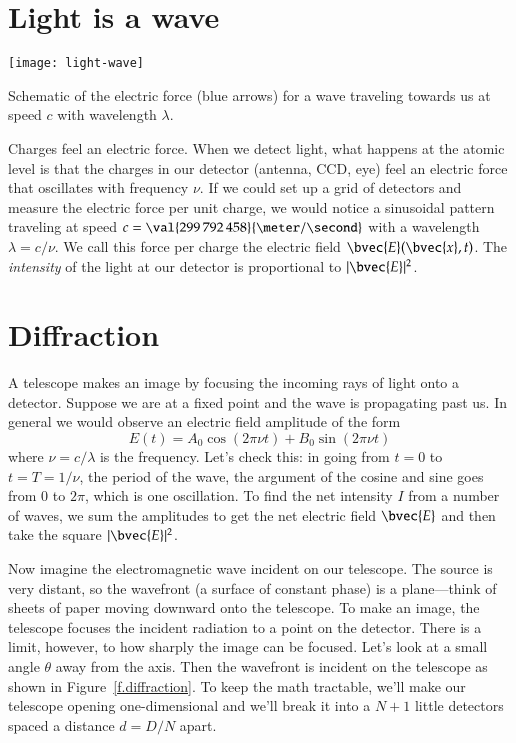 \section{Light is a wave}

\begin{marginfigure}
\texttt{[image: light-wave]}
\caption[The electric force in a light wave]{Schematic of the electric force (blue arrows) for a wave traveling towards us at speed $c$ with wavelength $\lambda$.}
\label{f.light-wave}
\end{marginfigure}
Charges feel an electric force.
When we detect light, what happens at the atomic level is that the charges in our detector (antenna, CCD, eye) feel an electric force that oscillates with frequency $\nu$. If we could set up a grid of detectors and measure the electric force per unit charge, we would notice a sinusoidal pattern traveling at speed $c = \val{299\,792\,458}{\meter/\second}$ with a wavelength $\lambda = c/\nu$.  We call this force per charge the electric field $\bvec{E}(\bvec{x},t)$. The \emph{intensity} of the light at our detector is proportional to $|\bvec{E}|^{2}$.

\section{Diffraction}

A telescope makes an image by focusing the incoming rays of light onto a detector.
Suppose we are at a fixed point and the wave is propagating past us.  In general we would observe an electric field amplitude of the form 
\[ E(t) = A_{0}\cos\left(2\pi \nu t \right)  + B_{0}\sin\left(2\pi \nu t \right) \]
where $\nu = c/\lambda$ is the frequency.  Let's check this: in going from $t=0$ to $t=T=1/\nu$, the period of the wave, the argument of the cosine and sine goes from $0$ to $2\pi$, which is one oscillation.  To find the net intensity $I$ from a number of waves, we sum the amplitudes to get the net electric field $\bvec{E}$ and then take the square $|\bvec{E}|^{2}$.

Now imagine the electromagnetic wave incident on our telescope. The source is very distant, so the wavefront (a surface of constant phase) is a plane---think of sheets of paper moving downward onto the telescope.  To make an image, the telescope focuses the incident radiation to a point on the detector. There is a limit, however, to how sharply the image can be focused.  Let's look at a small angle $\theta$ away from the axis.  Then the wavefront is incident on the telescope as shown in Figure~\ref{f.diffraction}. To keep the math tractable, we'll make our telescope opening one-dimensional and we'll break it into a $N+1$ little detectors spaced a distance $d = D/N$ apart.


